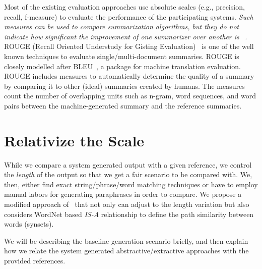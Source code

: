 \documentclass{sig-alternate-05-2015}
\begin{document}
\fi
\par Most of the existing evaluation approaches use absolute scales (e.g., precision, recall, f-measure) to evaluate the performance of the participating systems. \emph{Such measures can be used to compare summarization algorithms, but they do not indicate how significant the improvement of one summarizer over another is }~\cite{Goldstein:1999:STD:312624.312665}. ROUGE (Recall Oriented Understudy for Gisting Evaluation)~\cite{Lin04rouge:a} is one of the well known techniques to evaluate single/multi-document summaries. ROUGE is closely modelled after BLEU~\cite{Papineni:2002:BMA:1073083.1073135}, a package for machine translation evaluation. ROUGE includes measures to automatically determine the quality of a summary by comparing it to other (ideal) summaries created by humans. The measures count the number of overlapping units such as n-gram, word sequences, and word pairs between the machine-generated summary and the reference summaries. 

\section{Relativize the Scale}
While we compare a system generated output with a given reference, we control the \emph{length} of the output so that we get a fair scenario to be compared with. We, then, either find exact string/phrase/word matching techniques or have to employ manual labors for generating paraphrases in order to compare. We propose a modified approach of~\cite{DBLP:conf/ecir/HamidHT16} that not only can adjust to the length variation but also considers WordNet based \emph{IS-A} relationship to define the path similarity between words (synsets).
\par We will be describing the baseline generation scenario briefly, and then explain how we relate the system generated abstractive/extractive approaches with the provided references.
\end{document}
